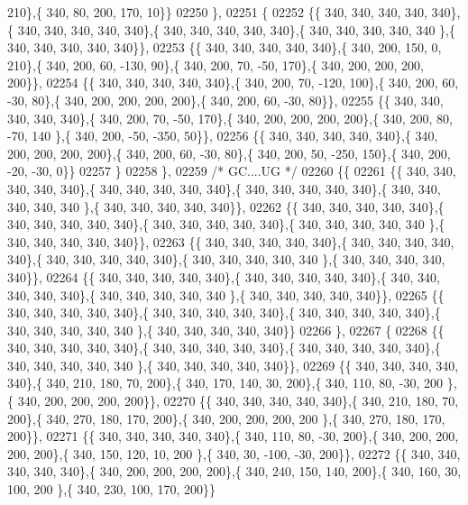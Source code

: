 \begin{DoxyCode}
      210\},\{ 340,  80, 200, 170,  10\}\}
02250 \},
02251 \{
02252 \{\{ 340, 340, 340, 340, 340\},\{ 340, 340, 340, 340, 340\},\{ 340, 340, 340, 340, 340\},\{ 340, 340, 340, 340, 340
      \},\{ 340, 340, 340, 340, 340\}\},
02253 \{\{ 340, 340, 340, 340, 340\},\{ 340, 200, 150,   0, 210\},\{ 340, 200,  60, -130,  90\},\{ 340, 200,  70, -50, 
      170\},\{ 340, 200, 200, 200, 200\}\},
02254 \{\{ 340, 340, 340, 340, 340\},\{ 340, 200,  70, -120, 100\},\{ 340, 200,  60, -30,  80\},\{ 340, 200, 200, 200, 
      200\},\{ 340, 200,  60, -30,  80\}\},
02255 \{\{ 340, 340, 340, 340, 340\},\{ 340, 200,  70, -50, 170\},\{ 340, 200, 200, 200, 200\},\{ 340, 200,  80, -70, 140
      \},\{ 340, 200, -50, -350,  50\}\},
02256 \{\{ 340, 340, 340, 340, 340\},\{ 340, 200, 200, 200, 200\},\{ 340, 200,  60, -30,  80\},\{ 340, 200,  50, -250, 
      150\},\{ 340, 200, -20, -30,   0\}\}
02257 \}
02258 \},
02259 \textcolor{comment}{/* GC....UG */}
02260 \{\{
02261 \{\{ 340, 340, 340, 340, 340\},\{ 340, 340, 340, 340, 340\},\{ 340, 340, 340, 340, 340\},\{ 340, 340, 340, 340, 340
      \},\{ 340, 340, 340, 340, 340\}\},
02262 \{\{ 340, 340, 340, 340, 340\},\{ 340, 340, 340, 340, 340\},\{ 340, 340, 340, 340, 340\},\{ 340, 340, 340, 340, 340
      \},\{ 340, 340, 340, 340, 340\}\},
02263 \{\{ 340, 340, 340, 340, 340\},\{ 340, 340, 340, 340, 340\},\{ 340, 340, 340, 340, 340\},\{ 340, 340, 340, 340, 340
      \},\{ 340, 340, 340, 340, 340\}\},
02264 \{\{ 340, 340, 340, 340, 340\},\{ 340, 340, 340, 340, 340\},\{ 340, 340, 340, 340, 340\},\{ 340, 340, 340, 340, 340
      \},\{ 340, 340, 340, 340, 340\}\},
02265 \{\{ 340, 340, 340, 340, 340\},\{ 340, 340, 340, 340, 340\},\{ 340, 340, 340, 340, 340\},\{ 340, 340, 340, 340, 340
      \},\{ 340, 340, 340, 340, 340\}\}
02266 \},
02267 \{
02268 \{\{ 340, 340, 340, 340, 340\},\{ 340, 340, 340, 340, 340\},\{ 340, 340, 340, 340, 340\},\{ 340, 340, 340, 340, 340
      \},\{ 340, 340, 340, 340, 340\}\},
02269 \{\{ 340, 340, 340, 340, 340\},\{ 340, 210, 180,  70, 200\},\{ 340, 170, 140,  30, 200\},\{ 340, 110,  80, -30, 200
      \},\{ 340, 200, 200, 200, 200\}\},
02270 \{\{ 340, 340, 340, 340, 340\},\{ 340, 210, 180,  70, 200\},\{ 340, 270, 180, 170, 200\},\{ 340, 200, 200, 200, 200
      \},\{ 340, 270, 180, 170, 200\}\},
02271 \{\{ 340, 340, 340, 340, 340\},\{ 340, 110,  80, -30, 200\},\{ 340, 200, 200, 200, 200\},\{ 340, 150, 120,  10, 200
      \},\{ 340,  30, -100, -30, 200\}\},
02272 \{\{ 340, 340, 340, 340, 340\},\{ 340, 200, 200, 200, 200\},\{ 340, 240, 150, 140, 200\},\{ 340, 160,  30, 100, 200
      \},\{ 340, 230, 100, 170, 200\}\}

\end{DoxyCode}
